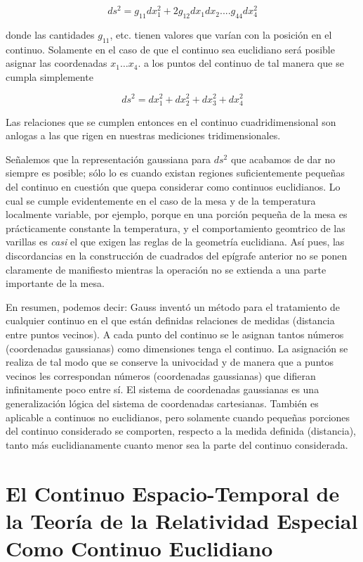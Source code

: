 \documentclass[spanish]{book}
\begin{document}
\[ds^{2}=g_{11}dx_{1}^{2}+2g_{12}dx_{1}dx_{2}....g_{44}dx_{4}^{2}\]

\noindent donde las cantidades $g_{11}$, etc. tienen valores que varían con la posición en el continuo.
Solamente en el caso de que el continuo sea euclidiano será posible asignar las
coordenadas $x_{1}\ldots x_{4}$. a los puntos del continuo de tal manera que se cumpla
simplemente

\[ds^{2}=dx_{1}^{2}+dx_{2}^{2}+dx_{3}^{2}+dx_{4}^{2}\]

Las relaciones que se cumplen entonces en el continuo cuadridimensional son anlogas
a las que rigen en nuestras mediciones tridimensionales.

Señalemos que la representación gaussiana para $ds^{2}$ que acabamos de dar no siempre
es posible; sólo lo es cuando existan regiones suficientemente pequeñas del continuo
en cuestión que quepa considerar como continuos euclidianos. Lo cual se cumple
evidentemente en el caso de la mesa y de la temperatura localmente variable, por
ejemplo, porque en una porción pequeña de la mesa es prácticamente constante la
temperatura, y el comportamiento geomtrico de las varillas es \textit{casi} el que exigen las
reglas de la geometría euclidiana. Así pues, las discordancias en la construcción de
cuadrados del epígrafe anterior no se ponen claramente de manifiesto mientras la
operación no se extienda a una parte importante de la mesa.

En resumen, podemos decir: Gauss inventó un método para el tratamiento de
cualquier continuo en el que están definidas relaciones de medidas (distancia entre
puntos vecinos). A cada punto del continuo se le asignan tantos números (coordenadas
gaussianas) como dimensiones tenga el continuo. La asignación se realiza de tal modo
que se conserve la univocidad y de manera que a puntos vecinos les correspondan
números (coordenadas gaussianas) que difieran infinitamente poco entre sí. El sistema
de coordenadas gaussianas es una generalización lógica del sistema de coordenadas
cartesianas. También es aplicable a continuos no euclidianos, pero solamente cuando
pequeñas porciones del continuo considerado se comporten, respecto a la medida
definida (distancia), tanto más euclidianamente cuanto menor sea la parte del
continuo considerada.


\chapter{El Continuo Espacio-Temporal de la Teoría de la Relatividad Especial
Como Continuo Euclidiano}
\end{document}

